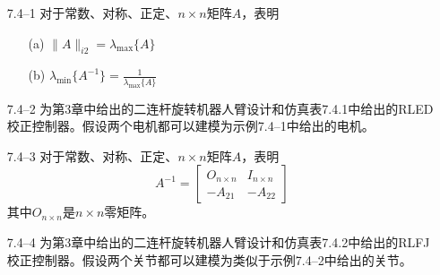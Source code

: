 \documentclass[UTF8]{ctexart}
\begin{document}
\begin{enumerate}
\item[7.4--1] 对于常数、对称、正定、$n \times n$矩阵$A$，表明
\begin{enumerate}
\item[(a)] $\|A\|_{i2} = \lambda_{\max}\{A\}$
\item[(b)] $\lambda_{\min}\{A^{-1}\} = \frac{1}{\lambda_{\max}\{A\}}$
\end{enumerate}

\item[7.4--2] 为第3章中给出的二连杆旋转机器人臂设计和仿真表7.4.1中给出的RLED校正控制器。假设两个电机都可以建模为示例7.4--1中给出的电机。

\item[7.4--3] 对于常数、对称、正定、$n \times n$矩阵$A$，表明
\[ A^{-1} = \begin{bmatrix} O_{n \times n} & I_{n \times n} \\ -A_{21} & -A_{22} \end{bmatrix} \]
其中$O_{n \times n}$是$n \times n$零矩阵。

\item[7.4--4] 为第3章中给出的二连杆旋转机器人臂设计和仿真表7.4.2中给出的RLFJ校正控制器。假设两个关节都可以建模为类似于示例7.4--2中给出的关节。
\end{enumerate}

\ifstandalone
  
\end{document}
